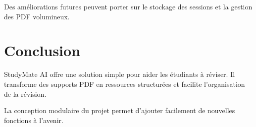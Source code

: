 ﻿\documentclass[12pt,a4paper]{report}
\begin{document}
Des améliorations futures peuvent porter sur le stockage des sessions et la gestion des PDF volumineux.

\chapter{Conclusion}
StudyMate AI offre une solution simple pour aider les étudiants à réviser. Il transforme des supports PDF en ressources structurées et facilite l'organisation de la révision.

La conception modulaire du projet permet d'ajouter facilement de nouvelles fonctions à l'avenir.
\end{document}
